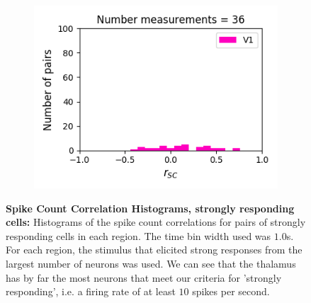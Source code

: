 \documentclass[a4paper,12pt]{article}
\theoremstyle{definition}
\begin{document}
\begin{figure}[p]
\begin{subfigure}{0.5\textwidth}
    \includegraphics[width=\textwidth]{figures/strong_v1_6_1p0_correlation_histogram.png}
  \end{subfigure}
  \caption{\textbf{Spike Count Correlation Histograms, strongly responding cells:} Histograms of the spike count correlations for pairs of strongly responding cells in each region. The time bin width used was $1.0$s. For each region, the stimulus that elicited strong responses from the largest number of neurons was used. We can see that the thalamus has by far the most neurons that meet our criteria for 'strongly responding', i.e. a firing rate of at least $10$ spikes per second.}
  \label{fig:strong_corr_histograms}
\end{figure}
\end{document}
